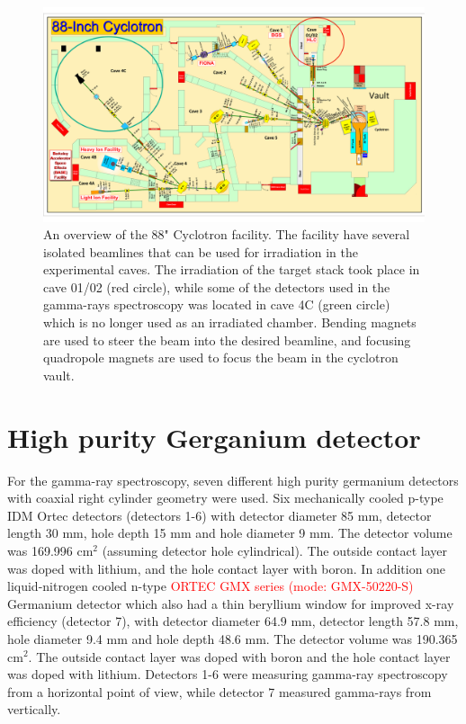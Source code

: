 \begin{figure}
    \centering
    \includegraphics[width=1\textwidth]{Experiment/Control-Room-Map-new.pdf}
    \caption{An overview of the 88" Cyclotron facility. The facility have several isolated beamlines that can be used for irradiation in the experimental caves. The irradiation of the target stack took place in cave 01/02 (red circle), while some of the detectors used in the gamma-rays spectroscopy was located in cave 4C (green circle) which is no longer used as an irradiated chamber. Bending magnets are used to steer the beam into the desired beamline, and focusing quadropole magnets are used to focus the beam in the cyclotron vault. }
    \label{fig:LBNL_88}
\end{figure}

\section{High purity Gerganium detector} \label{sec:detector_calibration}
\noindent  

For the gamma-ray spectroscopy, seven different high purity germanium detectors with coaxial right cylinder geometry were used. Six mechanically cooled p-type IDM Ortec detectors (detectors 1-6) with detector diameter 85 mm, detector length 30 mm, hole depth 15 mm and hole diameter 9 mm. The detector volume was 169.996 cm$^2$ (assuming detector hole cylindrical). The outside contact layer was doped with lithium, and the hole contact layer with boron. In addition one liquid-nitrogen cooled n-type \textcolor{red}{ORTEC GMX series (mode: GMX-50220-S)} Germanium detector which also had a thin beryllium window for improved x-ray efficiency (detector 7), with detector diameter 64.9 mm, detector length 57.8 mm, hole diameter 9.4 mm and hole depth 48.6 mm. The detector volume was 190.365 cm$^{2}$. The outside contact layer was doped with boron and the hole contact layer was doped with lithium. Detectors 1-6 were measuring gamma-ray spectroscopy from a horizontal point of view, while detector 7 measured gamma-rays from vertically.\\

